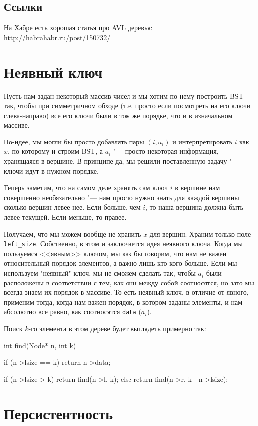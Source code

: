 \subsection{Ссылки}

На Хабре есть хорошая статья про AVL деревья:
\href{http://habrahabr.ru/post/150732/}{http://habrahabr.ru/post/150732/}

\section{Неявный ключ}

Пусть нам задан некоторый массив чисел и мы хотим по нему построить BST так, чтобы при симметричном обходе
(т.е. просто если посмотреть на его ключи слева-направо) все его ключи были в том же порядке, что и в изначальном массиве.

По-идее, мы могли бы просто добавлять пары $(i, a_i)$ и интерпретировать $i$ как $x$, по которому и строим BST,
а $a_i$ "--- просто некоторая информация, хранящаяся в вершине.
В принципе да, мы решили поставленную задачу "--- ключи идут в нужном порядке.

Теперь заметим, что на самом деле хранить сам ключ $i$ в вершине нам совершенно необязательно "--- нам просто нужно знать для каждой
вершины сколько вершин левее нее. Если больше, чем $i$, то наша вершина должна быть левее текущей. Если меньше, то правее.

Получаем, что мы можем вообще не хранить $x$ для вершин. Храним только поле \verb'left_size'.
Собственно, в этом и заключается идея неявного ключа. Когда мы пользуемся <<явным>> ключом, мы как бы говорим,
что нам не важен относительный порядок элементов, а важно лишь кто кого больше.
Если мы используем "неявный" ключ, мы не сможем сделать так, чтобы $a_i$ были расположены в соответствии с тем,
как они между собой соотносятся, но зато мы всегда знаем их порядок в массиве.
То есть неявный ключ, в отличие от явного, применим тогда, когда нам важен порядок, в котором заданы элементы,
и нам абсолютно все равно, как соотносятся \texttt{data} ($a_i$).

Поиск $k$-го элемента в этом дереве будет выглядеть примерно так:
\begin{cppcode}
int find(Node* n, int k) {
	if (n->lsize == k)
		return n->data;

		if (n->lsize > k)
			return find(n->l, k);
		else
			return find(n->r, k - n->lsize);
		}
\end{cppcode}

\section{Персистентность}

